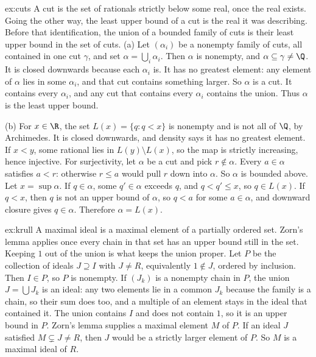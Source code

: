 \begin{solution}{ex:cuts}
\idea A cut is the set of rationals strictly below some real, once the real exists. Going the other way, the least upper bound of a cut is the real it was describing. Before that identification, the union of a bounded family of cuts is their least upper bound in the set of cuts.
\writeup (a) Let $(\alpha_i)$ be a nonempty family of cuts, all contained in one cut $\gamma$, and set $\alpha=\bigcup_i\alpha_i$. Then $\alpha$ is nonempty, and $\alpha\subseteq\gamma\ne\Q$. It is closed downwards because each $\alpha_i$ is. It has no greatest element: any element of $\alpha$ lies in some $\alpha_i$, and that cut contains something larger. So $\alpha$ is a cut. It contains every $\alpha_i$, and any cut that contains every $\alpha_i$ contains the union. Thus $\alpha$ is the least upper bound.

(b) For $x\in\R$, the set $L(x)=\{q:q<x\}$ is nonempty and is not all of $\Q$, by Archimedes. It is closed downwards, and density says it has no greatest element. If $x<y$, some rational lies in $L(y)\setminus L(x)$, so the map is strictly increasing, hence injective. For surjectivity, let $\alpha$ be a cut and pick $r\notin\alpha$. Every $a\in\alpha$ satisfies $a<r$: otherwise $r\le a$ would pull $r$ down into $\alpha$. So $\alpha$ is bounded above. Let $x=\sup\alpha$. If $q\in\alpha$, some $q'\in\alpha$ exceeds $q$, and $q<q'\le x$, so $q\in L(x)$. If $q<x$, then $q$ is not an upper bound of $\alpha$, so $q<a$ for some $a\in\alpha$, and downward closure gives $q\in\alpha$. Therefore $\alpha=L(x)$.
\end{solution}

\begin{solution}{ex:krull}
\idea A maximal ideal is a maximal element of a partially ordered set. Zorn's lemma applies once every chain in that set has an upper bound still in the set. Keeping $1$ out of the union is what keeps the union proper.
\writeup Let $P$ be the collection of ideals $J\supseteq I$ with $J\ne R$, equivalently $1\notin J$, ordered by inclusion. Then $I\in P$, so $P$ is nonempty. If $(J_k)$ is a nonempty chain in $P$, the union $J=\bigcup J_k$ is an ideal: any two elements lie in a common $J_k$ because the family is a chain, so their sum does too, and a multiple of an element stays in the ideal that contained it. The union contains $I$ and does not contain $1$, so it is an upper bound in $P$. Zorn's lemma supplies a maximal element $M$ of $P$. If an ideal $J$ satisfied $M\subsetneq J\ne R$, then $J$ would be a strictly larger element of $P$. So $M$ is a maximal ideal of $R$.
\end{solution}

